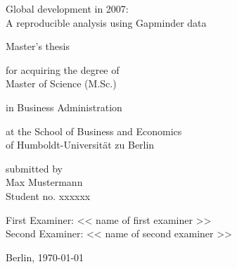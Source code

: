 \begin{titlepage}
    \color{black}  %
    \thispagestyle{empty}
  
    \vspace*{2cm}
  
    {\Large
    \noindent Global development in 2007:\\
    A reproducible analysis using Gapminder data}
  
    \vspace{2cm}
  
    {\LARGE
    \noindent
    Master’s thesis}
  
    \vspace{2cm}
  
    {\normalsize
    \noindent for acquiring the degree of\\
    Master of Science (M.Sc.)

    \vspace{0.5cm}

    \noindent in Business Administration
  
    \vspace{0.5cm}
  
    \noindent at the School of Business and Economics\\
    of Humboldt-Universität zu Berlin
  
    \vspace{2cm}
  
    \noindent submitted by\\
    Max Mustermann\\
    Student no. xxxxxx
  
    \vspace{2cm}
  
    \noindent First Examiner: << name of first examiner >>\\
    Second Examiner: << name of second examiner >>
  
    \vspace{1cm}
  
    \noindent Berlin, \today
    }
  
\end{titlepage}
